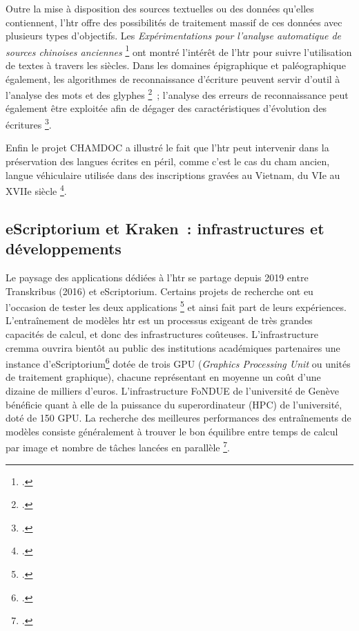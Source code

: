 \documentclass[a4paper,12pt,twoside]{book}
\begin{document}
				Outre la mise à disposition des sources textuelles ou des données
				qu'elles contiennent, l'\gls{htr} offre des possibilités de traitement massif
				de ces données avec plusieurs types d'objectifs. Les
				\textit{Expérimentations pour l'analyse automatique de sources chinoises anciennes}
				\footcite{bizais-lilligExperimentationsPourAnalyse2022} 
				ont montré l'intérêt de l'\gls{htr} pour suivre l'utilisation de textes à travers les siècles. Dans les domaines épigraphique et paléographique également, les algorithmes de reconnaissance d'écriture peuvent servir d'outil à l'analyse des mots et des glyphes
				\footcite{boschettiEpiSearchRecognisingAncient2022}~; l'analyse des erreurs de reconnaissance peut également être exploitée afin de dégager des
				caractéristiques d'évolution des écritures
				\footcite{paraskeviHTRHandwrittenPaleographic2022}.
				
				Enfin le projet CHAMDOC a illustré le fait que l'\gls{htr} peut intervenir
				dans la préservation des langues écrites en péril, comme c'est le cas du
				cham ancien, langue véhiculaire utilisée dans des inscriptions gravées
				au Vietnam, du VIe au XVIIe siècle
				\footcite{schweyerAnalyseReconnaissanceIndexation2022}.
		
			\subsection{eScriptorium et Kraken~: infrastructures et développements}
			
				Le paysage des applications dédiées à l'\gls{htr} se partage depuis 2019 entre Transkribus (2016) et eScriptorium. Certains projets de recherche ont eu
				l'occasion de tester les deux applications
				\footcite{leblancTranskribusEScriptoriumRetour2022, paupeCursiveXVIIeSiecle2022} 
				et ainsi fait part de leurs expériences. L'entraînement de modèles \gls{htr} est un processus exigeant de très grandes capacités de calcul, et donc des infrastructures coûteuses.
				L'infrastructure \gls{cremma} ouvrira bientôt au public des institutions
				académiques partenaires une instance d'eScriptorium\footcite{marguin-hamonDiscoursOuverturePresentation2022} dotée de trois GPU
				(\textit{Graphics Processing Unit} ou unités de traitement graphique),
				chacune représentant en moyenne un coût d'une dizaine de milliers
				d'euros. L'infrastructure FoNDUE de l'université de Genève bénéficie
				quant à elle de la puissance du superordinateur (HPC) de l'université,
				doté de 150 GPU. La recherche des meilleures performances des
				entraînements de modèles consiste généralement à trouver le bon
				équilibre entre temps de calcul par image et nombre de tâches lancées en
				parallèle
				\footcite{gabayFoNDUELightweightHTR2022}.
				
\end{document}
